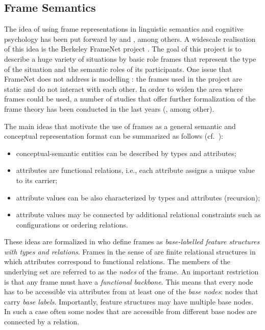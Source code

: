 \subsection{Frame Semantics}
The idea of using frame representations in linguistic semantics and cognitive
psychology has been put forward by \citet{Fillmore:82} and
\citet{Barsalou:92}, among others. A widescale realisation of this idea is the Berkeley FrameNet project \citep{Fillmore:03}. The goal of this project is to describe a huge variety of situations by basic role frames that represent the type of the situation and the semantic roles of its participants. One issue that FrameNet does not address is modelling : the frames used in the project are static and do not interact with each other. In order to widen the area where frames could be used, a number of studies that offer further formalization of the frame theory has been conducted in the last years (\citealt{Petersen:07, PetersenOsswald:10, KallmeyerOsswald:12, KallmeyerOsswald:13, KallmeyerOsswaldPogodalla:15, Loebner:2014}, among other).

The main ideas that motivate the use of frames as a general semantic and conceptual representation format can be summarized as follows (cf.\ \citealt{Loebner:2014}):

\begin{itemize}
\item conceptual-semantic entities can be described by types and
attributes;
\item attributes are functional relations, i.e., each attribute assigns a unique
value to its carrier;
\item attribute values can be also characterized by types and attributes (recursion);
\item attribute values may be connected by additional relational constraints \citep{Barsalou:92} such as  configurations or ordering relations.
\end{itemize}

These ideas are formalized in \citet{KallmeyerOsswald:13} who define frames
as \emph{base-labelled feature structures with types and relations}.
Frames in the sense of \citet{KallmeyerOsswald:13} are finite relational structures in which attributes correspond to functional relations. The members of the underlying set are referred to as the \emph{nodes} of the frame. An important restriction is that any frame must have a \emph{functional
backbone}. This means that every node has to be accessible via attributes
from at least one of the \emph{base nodes}: nodes that carry \emph{base labels}. Importantly, feature structures may have multiple base nodes. In such a case often some nodes that are accessible from different base nodes are connected by a relation.

